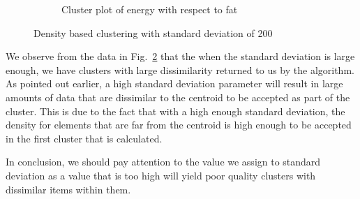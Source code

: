 \documentclass[letterpaper,12pt]{article}
\begin{document}
\begin{figure}[H]
\begin{subfigure}{.4\textwidth}
  \caption{Cluster plot of energy with respect to fat}
  \label{fig:sub-second_4}
\end{subfigure}
\caption{Density based clustering with standard deviation of 200}
\label{fig:fig_5}
\end{figure}


We observe from the data in Fig.~\ref{fig:fig_5} that the when the standard deviation is large enough, we have clusters with large dissimilarity returned to us by the algorithm. As pointed out earlier, a high standard deviation parameter will result in large amounts of data that are dissimilar to the centroid to be accepted as part of the cluster. This is due to the fact that with  a high enough standard deviation, the density for elements that are far from the centroid is high enough to be accepted in the first cluster that is calculated.

In conclusion, we should pay attention to the value we assign to standard deviation as a value that is too high will yield poor quality clusters with dissimilar items within them.
\end{document}
